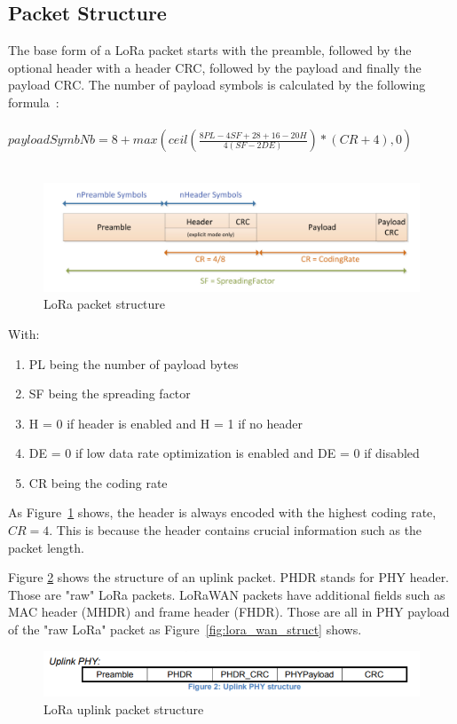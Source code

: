 \subsection{Packet Structure}
\label{sec:pkt_structure}
The base form of a LoRa packet starts with the preamble, followed by the optional header with a header CRC, followed by the payload and finally the 
payload CRC. The number of payload symbols is calculated by the following formula~\cite{SX_design_guide}:\\ \\
$payloadSymbNb = 8 + max{(ceil(\frac{8PL-4SF+28+16-20H}{4(SF-2DE)})*(CR+4),0)}$ 
\\ \\

\begin{figure}[h]
    \centering
    \includegraphics[width=1\textwidth]{figures/packet_struct.png}
    \caption{LoRa packet structure~\cite{SX_design_guide}}
    \label{fig:packet_struct}
\end{figure}

With: 
\begin{enumerate}
    \item PL being the number of payload bytes
    \item SF being the spreading factor
    \item H = 0 if header is enabled and H = 1 if no header
    \item DE = 0 if low data rate optimization is enabled and DE = 0 if disabled
    \item CR being the coding rate
    
\end{enumerate}

As Figure~\ref{fig:packet_struct} shows, the header is always encoded with the highest coding rate, $CR=4$.
This is because the header contains crucial information such as the packet length.

Figure \ref{fig:uplink_struct} shows the structure of an uplink packet. PHDR stands for PHY header.
Those are "raw" LoRa packets. LoRaWAN packets have additional fields such as MAC header (MHDR) and 
frame header (FHDR). Those are all in PHY payload of the "raw LoRa" packet as Figure~\ref{fig:lora_wan_struct} 
shows.   
\begin{figure}[h]
    \centering
    \includegraphics[width=1\textwidth]{figures/uplink_struct.png}
    \caption{LoRa uplink packet structure~\cite{lora_wan_spec}}
    \label{fig:uplink_struct}
\end{figure}


